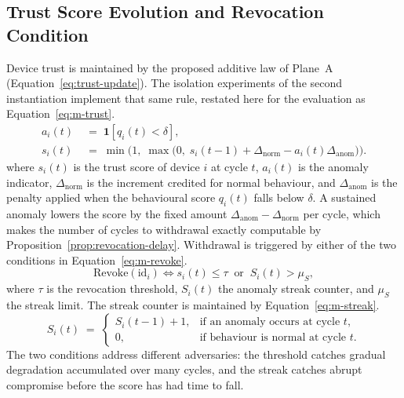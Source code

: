 \subsection{Trust Score Evolution and Revocation Condition}
\label{sec:metric-trust}

Device trust is maintained by the proposed additive law of Plane~A
(Equation~\eqref{eq:trust-update}). The isolation experiments of the second
instantiation implement that same rule, restated here for the evaluation as
Equation~\eqref{eq:m-trust}.
\begin{equation}
\label{eq:m-trust}
\begin{aligned}
a_i(t) &\;=\; \mathbf{1}\!\left[q_i(t)<\delta\right], \\
s_i(t) &\;=\; \min\!\Big(1,\;\max\!\big(0,\;s_i(t-1)
{}+\Delta_{\mathrm{norm}}-a_i(t)\Delta_{\mathrm{anom}}\big)\Big) .
\end{aligned}
\end{equation}
where $s_i(t)$ is the trust score of device $i$ at cycle $t$,
$a_i(t)$ is the anomaly indicator, $\Delta_{\mathrm{norm}}$ is the increment
credited for normal behaviour, and
$\Delta_{\mathrm{anom}}$ is the penalty applied when the behavioural score
$q_i(t)$ falls below $\delta$. A sustained anomaly lowers the score by the fixed
amount $\Delta_{\mathrm{anom}}-\Delta_{\mathrm{norm}}$ per cycle, which makes the
number of cycles to withdrawal exactly computable by
Proposition~\ref{prop:revocation-delay}. Withdrawal is triggered by either of
the two conditions in Equation~\eqref{eq:m-revoke}.
\begin{equation}
\label{eq:m-revoke}
\mathrm{Revoke}(\mathrm{id}_i) \iff s_i(t) \leq \tau \;\; \text{or} \;\; S_i(t) > \mu_S ,
\end{equation}
where $\tau$ is the revocation threshold, $S_i(t)$ the anomaly streak counter, and $\mu_S$ the streak limit. The streak counter is maintained by Equation~\eqref{eq:m-streak}.
\begin{equation}
\label{eq:m-streak}
S_i(t) \;=\;
\begin{cases}
S_i(t-1) + 1, & \text{if an anomaly occurs at cycle } t, \\
0, & \text{if behaviour is normal at cycle } t.
\end{cases}
\end{equation}
The two conditions address different adversaries: the threshold catches gradual degradation accumulated over many cycles, and the streak catches abrupt compromise before the score has had time to fall.

